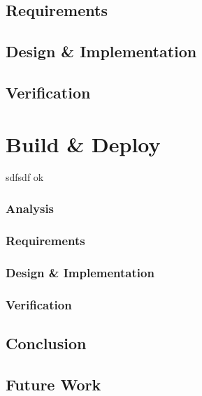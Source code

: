 \documentclass[10pt,a4paper]{memoir}
\begin{document}
\section{Requirements}
\section{Design \& Implementation}
\section{Verification}

\chapter{Build \& Deploy}

\blindtext
\cbstart
sdfsdf
ok
\blindtext
\cbend
\blindtext
\subsection{Analysis}
\subsection{Requirements}
\subsection{Design \& Implementation}
\subsection{Verification}


\section{Conclusion}
\section{Future Work}
\listoftodos
\end{document}

